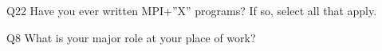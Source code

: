 \begin{description}%
\item{Q22} Have you ever written MPI+”X” programs? If so, select all that apply.%
\item{Q8} What is your major role at your place of work?%
\end{description}%
